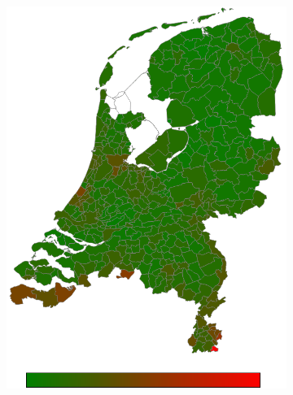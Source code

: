 \documentclass[a4paper,twoside,11pt]{article}
\begin{document}
\begin{figure}[h]
\begin{subfigure}[b]{0.12\textwidth}
                \includegraphics[width=\textwidth]{Heatmaps/HeatMap6.png}
                \caption{}
                \label{fig:EuropeAmerica}
        \end{subfigure}
        \begin{subfigure}[b]{0.12\textwidth}

\end{subfigure}
\end{figure}
\end{document}
